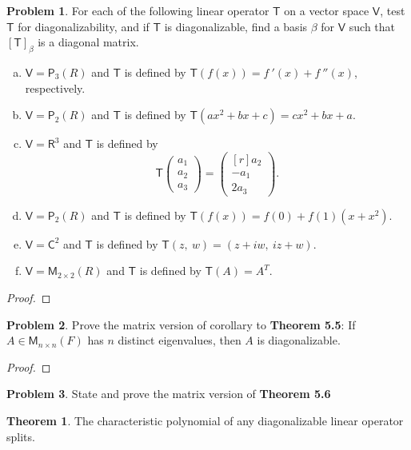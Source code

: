 \documentclass[12pt]{book}
\theoremstyle{definition}
\newtheorem{theorem}{Theorem}[chapter]
\newtheorem{problem}{Problem}
\begin{document}
	\begin{problem}
		For each of the following linear operator $\mathsf{T}$ on a vector space $\mathsf{V}$, test $\mathsf{T}$ for diagonalizability, and if $\mathsf{T}$ is diagonalizable, find a basis $\beta$ for $\mathsf{V}$ such that $[\mathsf{T}]_{\beta}$ is a diagonal matrix.
		\begin{enumerate}[(a)]
			\item $\mathsf{V}=\mathsf{P}_3(R)$ and $\mathsf{T}$ is defined by $\mathsf{T}(f(x))=f\ '(x)+f\ ''(x)$, respectively.
			\item $\mathsf{V}=\mathsf{P}_2(R)$ and $\mathsf{T}$ is defined by $\mathsf{T}(ax^2+bx+c)=cx^2+bx+a$.
			\item $\mathsf{V}=\mathsf{R}^3$ and $\mathsf{T}$ is defined by$$\mathsf{T}\begin{pmatrix}
				a_1\\a_2\\a_3
			\end{pmatrix}=\begin{pmatrix*}[r]
			a_2\\-a_1\\2a_3
		\end{pmatrix*}.$$
			\item $\mathsf{V}=\mathsf{P}_2(R)$ and $\mathsf{T}$ is defined by $\mathsf{T}(f(x))=f(0)+f(1)(x+x^2)$.
			\item $\mathsf{V}=\mathsf{C}^2$ and $\mathsf{T}$ is defined by $\mathsf{T}(z,~w)=(z+iw,~iz+w)$.
			\item $\mathsf{V}=\mathsf{M}_{2\times 2}(R)$ and $\mathsf{T}$ is defined by $\mathsf{T}(A)=A^T$.
		\end{enumerate}
	\end{problem}
	\begin{proof}
	\end{proof}
	\newpage
	\begin{problem}
		Prove the matrix version of corollary to \textbf{Theorem 5.5}: If $A\in\mathsf{M}_{n\times n}(F)$ has $n$ distinct eigenvalues, then $A$ is diagonalizable.
	\end{problem}
	\begin{proof}
	\end{proof}
	\newpage
	\begin{problem}
		State and prove the matrix version of \textbf{Theorem 5.6}
	\end{problem}
	\setcounter{theorem}{5}
	\begin{theorem}
		The characteristic polynomial of any diagonalizable linear operator splits.
	\end{theorem}
\end{document}
